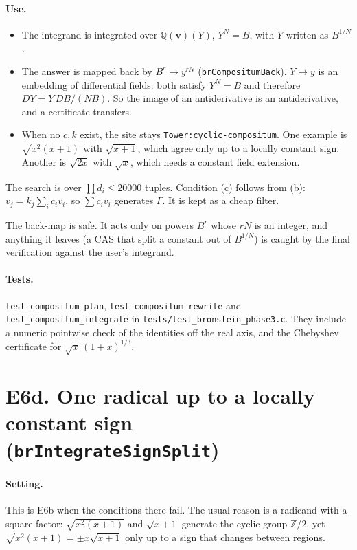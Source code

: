 \documentclass[11pt]{article}
\theoremstyle{definition}
\theoremstyle{remark}
\newcommand{\Q}{\mathbb{Q}}
\newcommand{\Z}{\mathbb{Z}}
\newcommand{\code}[1]{\texttt{#1}}
\begin{document}
\paragraph{Use.}
\begin{itemize}
\item The integrand is integrated over $\Q(\mathbf v)(Y)$, $Y^N=B$, with $Y$
  written as $B^{1/N}$.
\item The answer is mapped back by $B^r\mapsto y^{rN}$ (\code{brCompositumBack}).
  $Y\mapsto y$ is an embedding of differential fields: both satisfy $Y^N=B$ and
  therefore $DY=Y\,DB/(NB)$. So the image of an antiderivative is an
  antiderivative, and a certificate transfers.
\item When no $c,k$ exist, the site stays \code{Tower:cyclic-compositum}. One
  example is $\sqrt{x^2(x+1)}$ with $\sqrt{x+1}$, which agree only up to a
  locally constant sign. Another is $\sqrt{2x}$ with $\sqrt x$, which needs a
  constant field extension.
\end{itemize}
The search is over $\prod d_i\le20000$ tuples. Condition (c) follows from (b):
$v_j=k_j\sum_ic_iv_i$, so $\sum c_iv_i$ generates $\Gamma$. It is kept as a
cheap filter.

The back-map is safe. It acts only on powers $B^r$ whose $rN$ is an integer, and
anything it leaves (a CAS that split a constant out of $B^{1/N}$) is caught by
the final verification against the user's integrand.

\paragraph{Tests.} \code{test\_compositum\_plan},
\code{test\_compositum\_rewrite} and \code{test\_compositum\_integrate} in
\code{tests/test\_bronstein\_phase3.c}. They include a numeric pointwise check of
the identities off the real axis, and the Chebyshev certificate for
$\sqrt x\,(1+x)^{1/3}$.

\section*{E6d. One radical up to a locally constant sign (\code{brIntegrateSignSplit})}

\paragraph{Setting.} This is E6b when the conditions there fail. The usual reason
is a radicand with a square factor: $\sqrt{x^2(x+1)}$ and $\sqrt{x+1}$ generate
the cyclic group $\Z/2$, yet $\sqrt{x^2(x+1)}=\pm x\sqrt{x+1}$ only up to a sign
that changes between regions.
\end{document}
